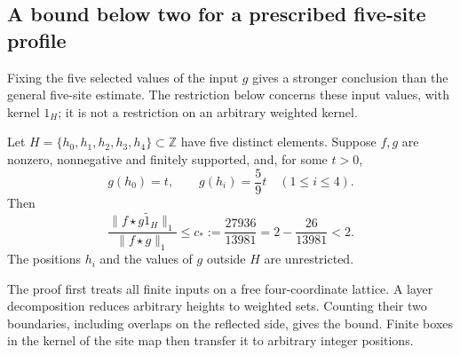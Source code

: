 \subsection{A bound below two for a prescribed five-site profile}
\label{sec:five-site-boundary}

Fixing the five selected values of the input $g$ gives a stronger
conclusion than the general five-site estimate. The restriction below
concerns these input values, with kernel $1_H$; it is not a restriction
on an arbitrary weighted kernel.

\begin{theorem}\label{thm:five-profile-boundary}
Let $H=\{h_0,h_1,h_2,h_3,h_4\}\subset\mathbb Z$ have five distinct
elements. Suppose $f,g$ are nonzero, nonnegative and finitely supported,
and, for some $t>0$,
\[
 g(h_0)=t,\qquad g(h_i)=\frac59t\quad(1\le i\le4).
\]
Then
\begin{equation}\label{eq:five-profile-boundary}
 \frac{\|f\star\widetilde{g1_H}\|_1}{\|f\star g\|_1}
 \le c_*:=\frac{27936}{13981}
 =2-\frac{26}{13981}<2.
\end{equation}
The positions $h_i$ and the values of $g$ outside $H$ are unrestricted.
\end{theorem}

The proof first treats all finite inputs on a free four-coordinate
lattice. A layer decomposition reduces arbitrary heights to weighted
sets. Counting their two boundaries, including overlaps on the reflected
side, gives the bound. Finite boxes in the kernel of the site map then
transfer it to arbitrary integer positions.

